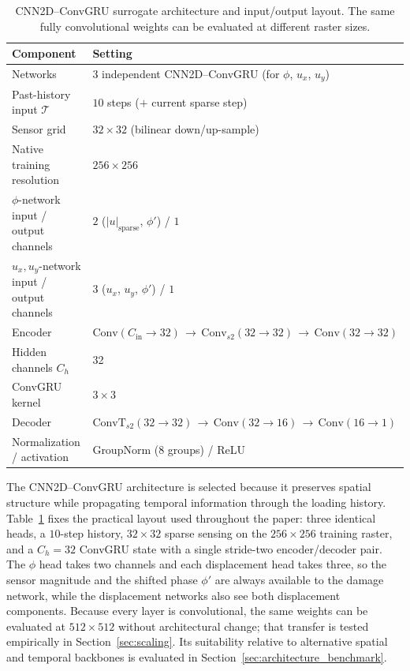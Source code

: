 \documentclass[10pt]{article}
\theoremstyle{definition}
\begin{document}
\begin{table}[htbp]
    \centering
    \caption{CNN2D--ConvGRU surrogate architecture and input/output layout. The same fully convolutional weights can be evaluated at different raster sizes.}
    \label{tab:ml_arch}
    \begin{tabular}{ll}
        \toprule
        Component & Setting \\
        \midrule
        Networks & 3 independent CNN2D--ConvGRU (for $\phi$, $u_x$, $u_y$) \\
        Past-history input $\mathcal{T}$ & $10$ steps ($+$ current sparse step) \\
        Sensor grid & $32\times32$ (bilinear down/up-sample) \\
        Native training resolution & $256\times256$ \\
        $\phi$-network input / output channels & $2$ ($|u|_{\mathrm{sparse}}$, $\phi'$) / $1$ \\
        $u_x,u_y$-network input / output channels & $3$ ($u_x$, $u_y$, $\phi'$) / $1$ \\
        Encoder & $\mathrm{Conv}(C_{\mathrm{in}}{\to}32)\,{\to}\,\mathrm{Conv}_{s2}(32{\to}32)\,{\to}\,\mathrm{Conv}(32{\to}32)$ \\
        Hidden channels $C_h$ & 32 \\
        ConvGRU kernel & $3\times3$ \\
        Decoder & $\mathrm{ConvT}_{s2}(32{\to}32)\,{\to}\,\mathrm{Conv}(32{\to}16)\,{\to}\,\mathrm{Conv}(16{\to}1)$ \\
        Normalization / activation & GroupNorm (8 groups) / ReLU \\
        \bottomrule
    \end{tabular}
\end{table}

The CNN2D--ConvGRU architecture is selected because it preserves spatial structure while propagating temporal information through the loading history.
%
Table~\ref{tab:ml_arch} fixes the practical layout used throughout the paper: three identical heads, a $10$-step history, $32\times32$ sparse sensing on the $256\times256$ training raster, and a $C_h=32$ ConvGRU state with a single stride-two encoder/decoder pair.
%
The $\phi$ head takes two channels and each displacement head takes three, so the sensor magnitude and the shifted phase $\phi'$ are always available to the damage network, while the displacement networks also see both displacement components.
%
Because every layer is convolutional, the same weights can be evaluated at $512\times512$ without architectural change; that transfer is tested empirically in Section~\ref{sec:scaling}.
%
Its suitability relative to alternative spatial and temporal backbones is evaluated in Section~\ref{sec:architecture_benchmark}.
\end{document}
